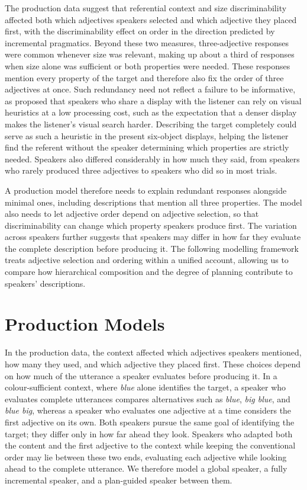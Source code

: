 \documentclass[10pt,a4paper,fleqn]{article}
\begin{document}
The production data suggest that referential context and size discriminability affected both which adjectives speakers selected and which adjective they placed first, with the discriminability effect on order in the direction predicted by incremental pragmatics.
Beyond these two measures, three-adjective responses were common whenever size was relevant, making up about a third of responses when size alone was sufficient or both properties were needed.
These responses mention every property of the target and therefore also fix the order of three adjectives at once.
Such redundancy need not reflect a failure to be informative, as \citet[p.~7]{rubio2019overinformative} proposed that speakers who share a display with the listener can rely on visual heuristics at a low processing cost, such as the expectation that a denser display makes the listener's visual search harder.
Describing the target completely could serve as such a heuristic in the present six-object displays, helping the listener find the referent without the speaker determining which properties are strictly needed.
Speakers also differed considerably in how much they said, from speakers who rarely produced three adjectives to speakers who did so in most trials.

A production model therefore needs to explain redundant responses alongside minimal ones, including descriptions that mention all three properties.
The model also needs to let adjective order depend on adjective selection, so that discriminability can change which property speakers produce first.
The variation across speakers further suggests that speakers may differ in how far they evaluate the complete description before producing it.
The following modelling framework treats adjective selection and ordering within a unified account, allowing us to compare how hierarchical composition and the degree of planning contribute to speakers' descriptions.

\FloatBarrier
\section{Production Models}
\label{sec:model}

In the production data, the context affected which adjectives speakers mentioned, how many they used, and which adjective they placed first.
These choices depend on how much of the utterance a speaker evaluates before producing it.
In a colour-sufficient context, where \emph{blue} alone identifies the target, a speaker who evaluates complete utterances compares alternatives such as \emph{blue}, \emph{big blue}, and \emph{blue big}, whereas a speaker who evaluates one adjective at a time considers the first adjective on its own.
Both speakers pursue the same goal of identifying the target; they differ only in how far ahead they look.
Speakers who adapted both the content and the first adjective to the context while keeping the conventional order may lie between these two ends, evaluating each adjective while looking ahead to the complete utterance.
We therefore model a global speaker, a fully incremental speaker, and a plan-guided speaker between them.
\end{document}
